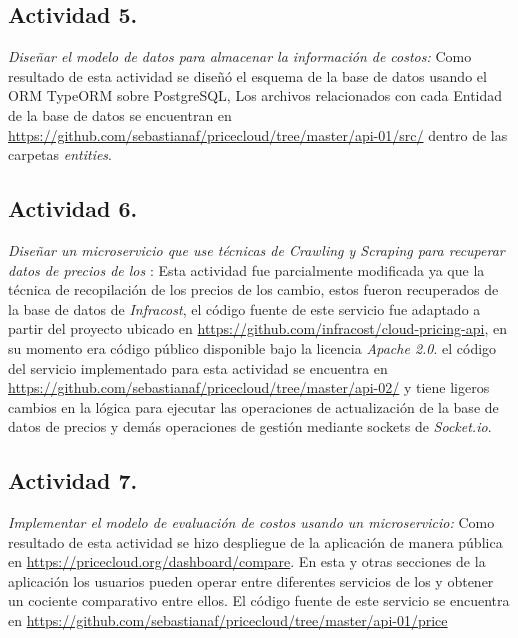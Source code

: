 \subsection{Actividad 5.}
\emph{Diseñar el modelo de datos para almacenar la información de costos:}
\newline\newline
Como resultado de esta actividad se diseñó el esquema de la base de datos usando el \acrshort{ORM} \gls{TypeORM} sobre \gls{PostgreSQL}, Los archivos relacionados con cada Entidad de la base de datos se encuentran en \url{https://github.com/sebastianaf/pricecloud/tree/master/api-01/src/} dentro de las carpetas \emph{entities}.

\subsection{Actividad 6.}
\emph{Diseñar un microservicio que use técnicas de \emph{Crawling} y \emph{Scraping} para recuperar datos de precios de los }:
\newline\newline
Esta actividad fue parcialmente modificada ya que la técnica de recopilación de los precios de los  cambio, estos fueron recuperados de la base de datos de \emph{Infracost}, el código fuente de este servicio fue adaptado a partir del proyecto   ubicado en \url{https://github.com/infracost/cloud-pricing-api}, en su momento era código público disponible bajo la licencia \emph{Apache 2.0}. el código del servicio implementado para esta actividad se encuentra en \url{https://github.com/sebastianaf/pricecloud/tree/master/api-02/} y tiene ligeros cambios en la lógica para ejecutar las operaciones de actualización de la base de datos de precios y demás operaciones de gestión mediante sockets de \emph{Socket.io}.

\subsection{Actividad 7.}
\emph{Implementar el modelo de evaluación de costos usando un microservicio:}\newline\newline
Como resultado de esta actividad se hizo despliegue de la aplicación de manera pública en \url{https://pricecloud.org/dashboard/compare}. En esta y otras secciones de la aplicación los usuarios pueden operar entre diferentes servicios de los  y obtener un cociente comparativo entre ellos. El código fuente de este servicio se encuentra en \url{https://github.com/sebastianaf/pricecloud/tree/master/api-01/price}

